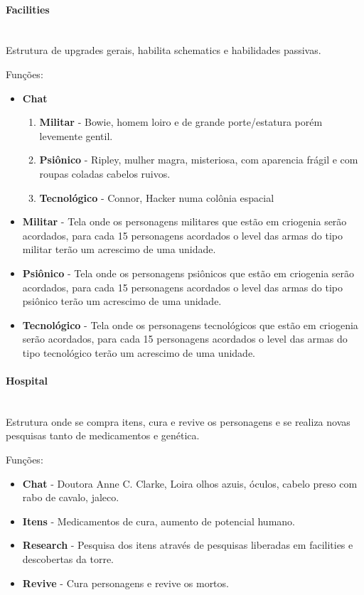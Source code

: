 \documentclass[11pt]{article} %
\begin{document}
\paragraph{Facilities} \mbox{}\\
Estrutura de upgrades gerais, habilita schematics e habilidades passivas.

Funções:
\begin{itemize}
  \item \textbf{Chat}
    \begin{enumerate}
      \item \textbf{Militar} - Bowie, homem loiro e de grande porte/estatura porém levemente gentil.
      \item \textbf{Psiônico} - Ripley, mulher magra, misteriosa, com aparencia frágil e com roupas coladas cabelos ruivos. 
      \item \textbf{Tecnológico} - Connor, Hacker numa colônia espacial
    \end{enumerate}
  \item \textbf{Militar} - Tela onde os personagens militares que estão em criogenia serão acordados, para cada 15 personagens acordados o level das armas do tipo militar terão um acrescimo de uma unidade.
  \item \textbf{Psiônico} - Tela onde os personagens psiônicos que estão em criogenia serão acordados, para cada 15 personagens acordados o level das armas do tipo psiônico terão um acrescimo de uma unidade.
  \item \textbf{Tecnológico} - Tela onde os personagens tecnológicos que estão em criogenia serão acordados, para cada 15 personagens acordados o level das armas do tipo tecnológico terão um acrescimo de uma unidade.
\end{itemize}

\paragraph{Hospital} \mbox{}\\
Estrutura onde se compra itens, cura e revive os personagens e se realiza novas pesquisas tanto de medicamentos e genética. 

Funções:
\begin{itemize}
  \item \textbf{Chat} - Doutora Anne C. Clarke, Loira olhos azuis, óculos, cabelo preso com rabo de cavalo, jaleco.
  \item \textbf{Itens} - Medicamentos de cura, aumento de potencial humano. 
  \item \textbf{Research} - Pesquisa dos itens através de pesquisas liberadas em facilities e descobertas da torre.
  \item \textbf{Revive} - Cura personagens e revive os mortos. 
\end{itemize}
\end{document}
